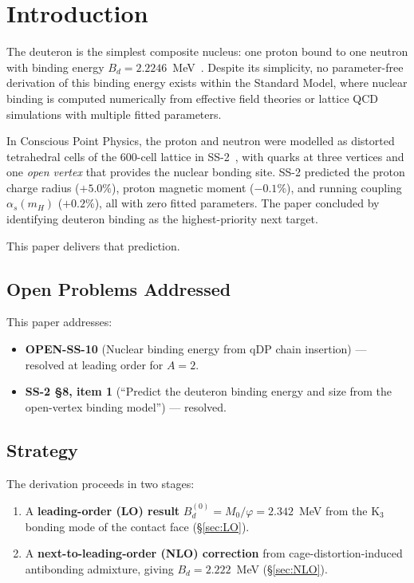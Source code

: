 \documentclass[11pt,letterpaper]{article}
\newcommand{\phig}{\varphi}
\newcommand{\Kthree}{\mathrm{K}_3}
\newcommand{\Mzero}{M_0}
\newcommand{\Bd}{B_d}
\newcommand{\Bdlo}{B_d^{(0)}}
\begin{document}
\raggedright
\tableofcontents
\newpage

\section{Introduction}
\label{sec:intro}

The deuteron is the simplest composite nucleus: one proton
bound to one neutron with binding energy
$\Bd = 2.2246$~MeV~\citep{pdg2024}.  Despite its simplicity,
no parameter-free derivation of this binding energy exists
within the Standard Model, where nuclear binding is computed
numerically from effective field theories or lattice QCD
simulations with multiple fitted parameters.

In Conscious Point Physics, the proton and neutron were modelled
as distorted tetrahedral cells of the 600-cell lattice in
SS-2~\citep{abshier2026ss2}, with quarks at three vertices and
one \emph{open vertex} that provides the nuclear bonding site.
SS-2 predicted the proton charge radius ($+5.0\%$), proton
magnetic moment ($-0.1\%$), and running coupling
$\alpha_s(m_H)$ ($+0.2\%$), all with zero fitted parameters.
The paper concluded by identifying deuteron binding as the
highest-priority next target.

This paper delivers that prediction.

\subsection{Open Problems Addressed}

This paper addresses:
\begin{itemize}
\item \textbf{OPEN-SS-10} (Nuclear binding energy from qDP chain
insertion) --- resolved at leading order for $A = 2$.
\item \textbf{SS-2 \S8, item 1} (``Predict the deuteron binding
energy and size from the open-vertex binding model'')
--- resolved.
\end{itemize}

\subsection{Strategy}

The derivation proceeds in two stages:
\begin{enumerate}
\item A \textbf{leading-order (LO) result}
$\Bdlo = \Mzero/\phig = 2.342$~MeV from the $\Kthree$
bonding mode of the contact face (\S\ref{sec:LO}).
\item A \textbf{next-to-leading-order (NLO) correction}
from cage-distortion-induced antibonding admixture, giving
$\Bd = 2.222$~MeV (\S\ref{sec:NLO}).
\end{enumerate}
\end{document}
